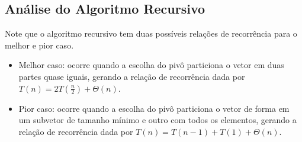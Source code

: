 \subsection{Análise do Algoritmo Recursivo}
Note que o algoritmo recursivo tem duas possíveis relações de recorrência para o melhor e pior caso. \\
\begin{itemize}
  \item Melhor caso: ocorre quando a escolha do pivô particiona o vetor em duas partes quase iguais, gerando a relação de recorrência dada por $T(n) = 2T(\frac{n}{2}) + \Theta(n)$.
  \item Pior caso: ocorre quando a escolha do pivô particiona o vetor de forma em um subvetor de tamanho mínimo e outro com todos os elementos, gerando a relação de recorrência dada por $T(n) = T(n - 1) + T(1) + \Theta(n)$.
\end{itemize}





